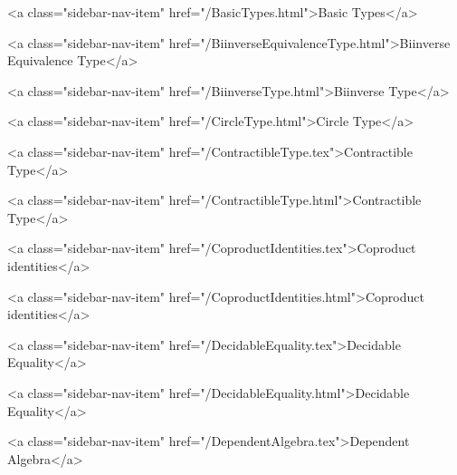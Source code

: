           <a class="sidebar-nav-item" href="/BasicTypes.html">Basic Types</a>
        
      
    
      
        
          <a class="sidebar-nav-item" href="/BiinverseEquivalenceType.html">Biinverse Equivalence Type</a>
        
      
    
      
        
          <a class="sidebar-nav-item" href="/BiinverseType.html">Biinverse Type</a>
        
      
    
      
        
          <a class="sidebar-nav-item" href="/CircleType.html">Circle Type</a>
        
      
    
      
        
          <a class="sidebar-nav-item" href="/ContractibleType.tex">Contractible Type</a>
        
      
    
      
        
          <a class="sidebar-nav-item" href="/ContractibleType.html">Contractible Type</a>
        
      
    
      
        
          <a class="sidebar-nav-item" href="/CoproductIdentities.tex">Coproduct identities</a>
        
      
    
      
        
          <a class="sidebar-nav-item" href="/CoproductIdentities.html">Coproduct identities</a>
        
      
    
      
        
          <a class="sidebar-nav-item" href="/DecidableEquality.tex">Decidable Equality</a>
        
      
    
      
        
          <a class="sidebar-nav-item" href="/DecidableEquality.html">Decidable Equality</a>
        
      
    
      
        
          <a class="sidebar-nav-item" href="/DependentAlgebra.tex">Dependent Algebra</a>
        
